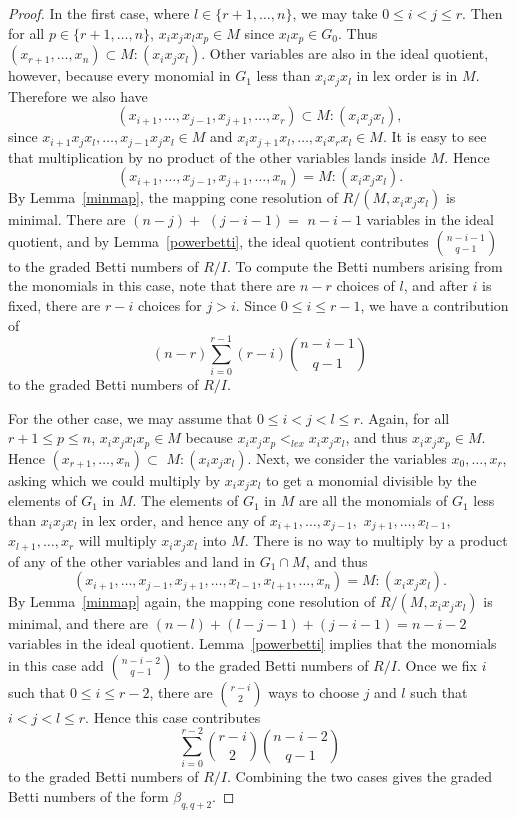 \documentclass{article}
\begin{document}
\begin{proof}
In the first case, where $l \in \{r+1,\dots,n\}$, we may take $0 \le i < j \le r$. Then for all $p \in \{r+1,\dots,n\}$, $x_ix_jx_lx_p \in M$ since $x_lx_p \in G_0$. Thus $(x_{r+1},\dots,x_n) \subset M:(x_ix_jx_l)$. Other variables are also in the ideal quotient, however, because every monomial in $G_1$ less than $x_ix_jx_l$ in lex order is in $M$. Therefore we also have \[(x_{i+1},\dots,x_{j-1},x_{j+1},\dots,x_r) \subset M:(x_ix_jx_l),\] since $x_{i+1}x_jx_l,\dots,x_{j-1}x_jx_l \in M$ and $x_ix_{j+1}x_l,\dots,x_ix_rx_l \in M$. It is easy to see that multiplication by no product of the other variables lands inside $M$. Hence \[ (x_{i+1},\dots,x_{j-1},x_{j+1},\dots,x_n) = M:(x_ix_jx_l).\] By Lemma~\ref{minmap}, the mapping cone resolution of $R/(M,x_ix_jx_l)$ is minimal. There are $(n-j)+$ $(j-i-1)=$ $n-i-1$ variables in the ideal quotient, and by Lemma~\ref{powerbetti}, the ideal quotient contributes ${n-i-1 \choose q-1}$ to the graded Betti numbers of $R/I$.  To compute the Betti numbers arising from the monomials in this case, note that there are $n-r$ choices of $l$, and after $i$ is fixed, there are $r-i$ choices for $j > i$. Since $0 \le i \le r-1$, we have a contribution of \[ \left ( n-r \right ) \sum_{i=0}^{r-1} \left (r-i \right ) {n-i-1 \choose q-1} \] to the graded Betti numbers of $R/I$.

For the other case, we may assume that $0 \le i < j < l \le r$. Again, for all $r+1 \le p \le n$, $x_ix_jx_lx_p \in M$ because $x_ix_jx_p <_{lex} x_ix_jx_l$, and thus $x_ix_jx_p \in M$. Hence $(x_{r+1},\dots,x_n) \subset$ $M:(x_ix_jx_l)$. Next, we consider the variables $x_0,\dots,x_r$, asking which we could multiply by $x_ix_jx_l$ to get a monomial divisible by the elements of $G_1$ in $M$. The elements of $G_1$ in $M$ are all the monomials of $G_1$ less than $x_ix_jx_l$ in lex order, and hence any of $x_{i+1},\dots,x_{j-1},$ $x_{j+1},\dots,x_{l-1},$ $x_{l+1},\dots,x_r$ will multiply $x_ix_jx_l$ into $M$. There is no way to multiply by a product of any of the other variables and land in $G_1 \cap M$, and thus \[(x_{i+1},\dots,x_{j-1},x_{j+1},\dots,x_{l-1},x_{l+1},\dots,x_n) = M:(x_ix_jx_l).\] By Lemma~\ref{minmap} again, the mapping cone resolution of $R/(M,x_ix_jx_l)$ is minimal, and there are $(n-l)+(l-j-1)+(j-i-1)=n-i-2$ variables in the ideal quotient. Lemma~\ref{powerbetti} implies that the monomials in this case add ${n-i-2 \choose q-1}$ to the graded Betti numbers of $R/I$. Once we fix $i$ such that $0 \le i \le r-2$, there are ${r-i \choose 2}$ ways to choose $j$ and $l$ such that $i < j < l \le r$. Hence this case contributes \[ \sum_{i=0}^{r-2} {r-i \choose 2} {n-i-2 \choose q-1} \] to the graded Betti numbers of $R/I$. Combining the two cases gives the graded Betti numbers of the form $\beta_{q,q+2}$.


\end{proof}
\end{document}

